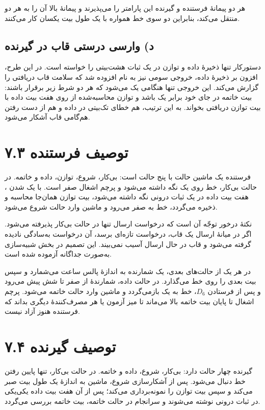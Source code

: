 \documentclass[12pt,a4paper]{article}
\begin{document}
	هر دو پیمانهٔ فرستنده و گیرنده این پارامتر را می‌پذیرند و پیمانهٔ بالا آن را به هر دو منتقل می‌کند، بنابراین دو سوی خط همواره با یک طول بیت یکسان کار می‌کنند.

	\subsection*{د) وارسی درستی قاب در گیرنده}
	دستورکار تنها ذخیرهٔ داده و توازن در یک ثبات هشت‌بیتی را خواسته است. در این طرح، افزون بر ذخیرهٔ داده، خروجی سومی نیز به نام  افزوده شد که سلامت قاب دریافتی را گزارش می‌کند. این خروجی تنها هنگامی یک می‌شود که هر دو شرط زیر برقرار باشند: بیت خاتمه در جای خود برابر یک باشد و توازن محاسبه‌شده از روی هفت بیت داده با بیت توازن دریافتی بخواند. به این ترتیب، هم خطای تک‌بیتی در داده و هم از دست رفتن هم‌گامی قاب آشکار می‌شود.

	\section*{۷.۳ توصیف فرستنده}
	فرستنده یک ماشین حالت با پنج حالت است: بی‌کار، شروع، توازن، داده و خاتمه. در حالت بی‌کار، خط روی یک نگه داشته می‌شود و پرچم اشغال صفر است. با یک شدن ، هفت بیت داده در یک ثبات درونی نگه داشته می‌شود، بیت توازن همان‌جا محاسبه و ذخیره می‌گردد، خط به صفر می‌رود و ماشین وارد حالت شروع می‌شود.

	نکتهٔ درخور توجّه آن است که درخواست ارسال تنها در حالت بی‌کار پذیرفته می‌شود. اگر در میانهٔ ارسال یک قاب، درخواست تازه‌ای برسد، آن درخواست به‌سادگی نادیده گرفته می‌شود و قاب در حال ارسال آسیب نمی‌بیند. این تصمیم در بخش شبیه‌سازی به‌صورت جداگانه آزموده شده است.

	در هر یک از حالت‌های بعدی، یک شمارنده به اندازهٔ  پالس ساعت می‌شمارد و سپس بیت بعدی را روی خط می‌گذارد. در حالت داده، شمارندهٔ  از صفر تا شش پیش می‌رود و پس از فرستادن \(D_6\)، خط به یک بازمی‌گردد و ماشین وارد حالت خاتمه می‌شود. پرچم اشغال تا پایان بیت خاتمه بالا می‌ماند تا میز آزمون یا هر مصرف‌کنندهٔ دیگری بداند که فرستنده هنوز آزاد نیست.


	\section*{۷.۴ توصیف گیرنده}
	گیرنده چهار حالت دارد: بی‌کار، شروع، داده و خاتمه. در حالت بی‌کار، تنها پایین رفتن خط دنبال می‌شود. پس از آشکارسازی شروع، ماشین به اندازهٔ یک طول بیت صبر می‌کند و سپس بیت توازن را نمونه‌برداری می‌کند؛ پس از آن هفت بیت داده یکی‌یکی در ثبات درونی نوشته می‌شوند و سرانجام در حالت خاتمه، بیت خاتمه بررسی می‌گردد.
\end{document}
